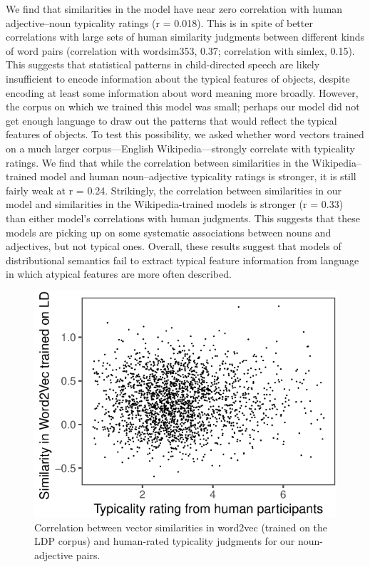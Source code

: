 \documentclass[10pt, letterpaper]{article}
\newenvironment{CodeChunk}{}{}
\begin{document}
We find that similarities in the model have near zero correlation with
human adjective--noun typicality ratings (r = 0.018). This is in spite
of better correlations with large sets of human similarity judgments
between different kinds of word pairs (correlation with wordsim353,
0.37; correlation with simlex, 0.15). This suggests that statistical
patterns in child-directed speech are likely insufficient to encode
information about the typical features of objects, despite encoding at
least some information about word meaning more broadly. However, the
corpus on which we trained this model was small; perhaps our model did
not get enough language to draw out the patterns that would reflect the
typical features of objects. To test this possibility, we asked whether
word vectors trained on a much larger corpus---English
Wikipedia---strongly correlate with typicality ratings. We find that
while the correlation between similarities in the Wikipedia--trained
model and human noun--adjective typicality ratings is stronger, it is
still fairly weak at r = 0.24. Strikingly, the correlation between
similarities in our model and similarities in the Wikipedia-trained
models is stronger (r = 0.33) than either model's correlations with
human judgments. This suggests that these models are picking up on some
systematic associations between nouns and adjectives, but not typical
ones. Overall, these results suggest that models of distributional
semantics fail to extract typical feature information from language in
which atypical features are more often described.

\begin{CodeChunk}
\begin{figure}[tb]

{\centering \includegraphics{figs/word2vec1-1} 

}

\caption[Correlation between vector similarities in word2vec (trained on the LDP corpus) and human-rated typicality judgments for our noun-adjective pairs]{Correlation between vector similarities in word2vec (trained on the LDP corpus) and human-rated typicality judgments for our noun-adjective pairs.}\label{fig:word2vec1}
\end{figure}
\end{CodeChunk}
\end{document}
